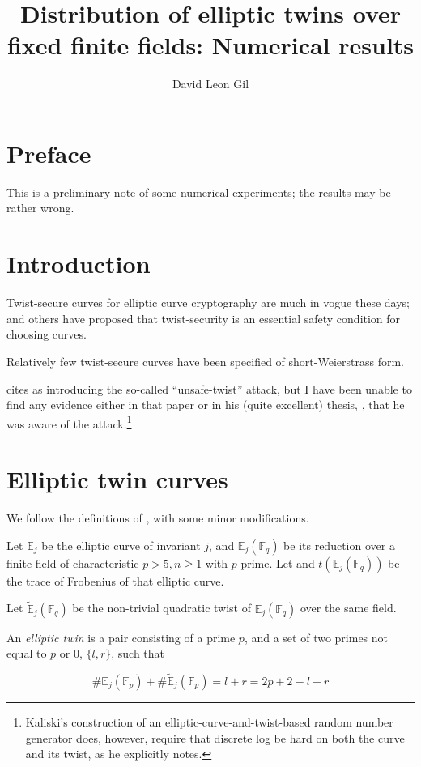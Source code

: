 \documentclass[11pt,fleqn]{article}
\title{Distribution of elliptic twins over fixed finite fields: Numerical results}
\author{David Leon Gil}
\newcommand{\BbbE}{\mathbb{E}}
\newcommand{\BbbF}{\mathbb{F}}
\newcommand{\Ej}{\ensuremath{\BbbE_j} }
\newcommand{\Ejfq}{\ensuremath{\BbbE_j(\BbbF_q)} }
\newcommand{\Ejfqt}{\ensuremath{\widetilde{\BbbE}_j(\BbbF_q)} }
\newcommand{\Ejfp}{\ensuremath{\BbbE_j(\BbbF_p)} }
\newcommand{\Ejfpt}{\ensuremath{\widetilde{\BbbE}_j(\BbbF_p)} }
\begin{document}
\maketitle

\section{Preface}

This is a preliminary note of some numerical experiments; the results
may be rather wrong.

\section{Introduction}

Twist-secure curves for elliptic curve cryptography are much in vogue
these days; \cite{curve25519} and others have proposed that twist-security
is an essential safety condition for choosing curves.

Relatively few twist-secure curves have been specified of short-Weierstrass
form. 

\cite{curve25519} cites \cite{KaliskiJCryptology} as introducing the
so-called ``unsafe-twist'' attack, but I have been unable to find any
evidence either in that paper or in his (quite excellent) thesis,
\cite{KaliskiThesis}, that he was aware of the attack.\footnote{Kaliski's
construction of an elliptic-curve-and-twist-based random number generator
does, however, require that discrete log be hard on both the curve and its
twist, as he explicitly notes.}

\section{Elliptic twin curves}

We follow the definitions of \autocite{ShparlinskiSutantyo}, with some minor
modifications.

Let $\Ej$ be the elliptic curve of invariant $j$, and $\Ejfq$ be its reduction
over a finite field of characteristic $p > 5, n \geq 1$ with $p$ prime. Let
and $t(\Ejfq)$ be the trace of Frobenius of that elliptic curve.

Let $\Ejfqt$ be the non-trivial quadratic twist of $\Ejfq$ over the same field.

An \emph{elliptic twin} is a pair consisting of a prime $p$, and a set of two
primes not equal to $p$ or $0$, $\lbrace l, r \rbrace$, such that

\begin{equation}
\#\Ejfp + \#\Ejfpt = l + r = 2 p + 2 - l + r
\end{equation}
\end{document}

